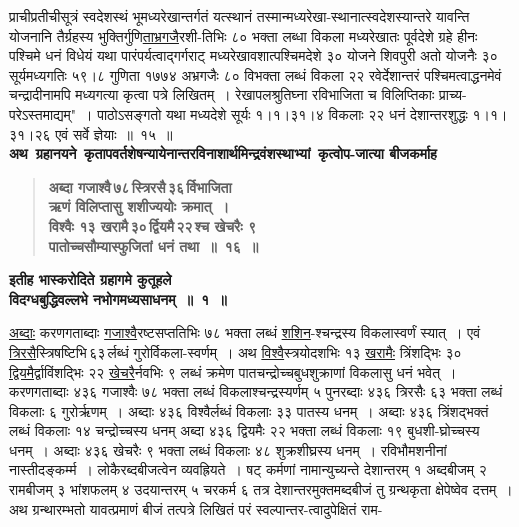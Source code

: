 \documentclass[11pt, openany]{book}
\begin{document}
प्राचीप्रतीचीसूत्रं स्वदेशस्थं भूमध्यरेखान्तर्गतं यत्स्थानं तस्मान्मध्यरेखा-स्थानात्स्वदेशस्यान्तरे यावन्ति योजनानि तैर्ग्रहस्य भुक्तिर्गुणि\hyperref[1.15]{ताभ्रगजै}रशी-तिभिः ८० भक्ता लब्धा विकला मध्यरेखातः पूर्वदेशे ग्रहे हीनः पश्चिमे धनं विधेयं यथा पारंपर्यत्वाद्गर्गराट् मध्यरेखावशात्पश्चिमदेशे ३० योजने शिवपुरी अतो योजनैः ३० सूर्यमध्यगतिः ५९।८ गुणिता १७७४ अभ्रगजैः ८० विभक्ता लब्धं विकला २२ रवेर्देशान्तरं पश्चिमत्वाद्धनमेवं चन्द्रादीनामपि मध्यगत्या कृत्वा पत्रे लिखितम्~। {\color{violet}रेखापलश्रुतिघ्ना रविभाजिता च विलिप्तिकाः प्राच्य-परेऽस्तमाद्यम्"~।} पाठोऽसङ्गतो यथा मध्यदेशे सूर्यः १।१।३१।४ विकलाः २२ धनं देशान्तरशुद्धः १।१।३१।२६ एवं सर्वे ज्ञेयाः~॥~१५~॥\\

{\small \textbf{अथ \,ग्रहानयने \,कृतापवर्तशेषन्यायेनान्तरविनाशार्थमिन्द्रवंशस्थाभ्यां \,कृत्वोप-जात्या बीजकर्माह \textendash }}

\newpage

 \label{1.16}
\begin{quote}
{\large \textbf{{\color{purple}अब्दा गजाश्वै\textendash \,७८\textendash \,स्त्रिरसै\textendash \,३६\textendash \,र्विभाजिता \\
ऋणं विलिप्तासु शशीज्ययोः क्रमात्~। \\
विश्वैः १३ खरामै\textendash \,३०\textendash \,र्द्वियमै\textendash \,२२\textendash \,श्च खेचरैः ९ \\
पातोच्चसौम्यास्फुजितां धनं तथा~॥~१६~॥}}}
\end{quote}

\begin{center}
{\large \textbf{इतीह भास्करोदिते ग्रहागमे कुतूहले \\
विदग्धबुद्धिवल्लभे नभोगमध्यसाधनम्~॥~१~॥ }}
\end{center}

\hyperref[1.16]{अब्दाः} \;करणगताब्दाः \;\hyperref[1.16]{गजाश्वै}रष्टसप्ततिभिः \;७८ \;भक्ता \;लब्धं \;\hyperref[1.16]{शशिन}-श्चन्द्रस्य विकलास्वर्णं स्यात्~। एवं \hyperref[1.16]{त्रिरसै}स्त्रिषष्टिभि\textendash \,६३\textendash \,र्लब्धं गुरोर्विकला-स्वर्णम्~। अथ \hyperref[1.16]{विश्वै}स्त्रयोदशभिः १३ \hyperref[1.16]{खरामैः} त्रिंशद्भिः ३० \hyperref[1.16]{द्वियमै}र्द्वाविंशद्भिः २२ \;\hyperref[1.16]{खेचरै}र्नवभिः \;९ \;लब्धं \;क्रमेण \;पातचन्द्रोच्चबुधशुक्राणां \;विकलासु \;धनं भवेत्~। करणगताब्दाः ४३६ गजाश्वैः ७८ भक्ता लब्धं विकलाश्चन्द्रस्यर्णम् ५ पुनरब्दाः ४३६ त्रिरसैः ६३ भक्ता लब्धं विकलाः ६ गुरोर्ऋणम्~। अब्दाः ४३६ विश्वैर्लब्धं विकलाः ३३ पातस्य धनम्~। अब्दाः ४३६ त्रिंशद्भक्तं लब्धं विकलाः १४ चन्द्रोच्चस्य धनम् अब्दा ४३६ द्वियमैः २२ भक्ता लब्धं विकलाः १९ बुधशी-घ्रोच्चस्य धनम्~। अब्दाः ४३६ खेचरैः ९ भक्ता लब्धं विकलाः ४८ शुक्रशीघ्रस्य धनम्~। रविभौमशनीनां नास्तीदङ्कर्म्म~। लोकैरब्दबीजत्वेन व्यवह्रियते~। षट् कर्मणां नामान्युच्यन्ते देशान्तरम् १ अब्दबीजम् २ रामबीजम् ३ भांशफलम् ४ उदयान्तरम् ५ चरकर्म ६ तत्र देशान्तरमुक्तमब्दबीजं तु ग्रन्थकृता क्षेपेष्वेव दत्तम्~। अथ ग्रन्थारम्भतो यावत्प्रमाणं बीजं तत्पत्रे लिखितं परं स्वल्पान्तर-त्वादुपेक्षितं राम-
\end{document}
